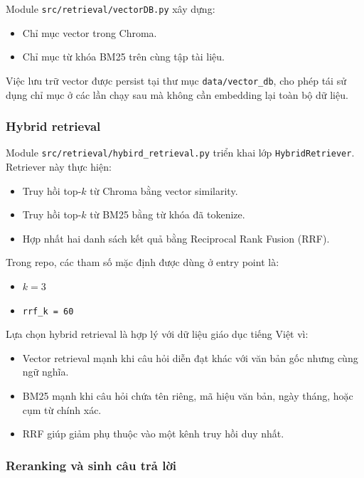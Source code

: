 \documentclass[12pt,a4paper]{article}
\begin{document}
Module \texttt{src/retrieval/vectorDB.py} xây dựng:
\begin{itemize}[leftmargin=1.5cm]
    \item Chỉ mục vector trong Chroma.
    \item Chỉ mục từ khóa BM25 trên cùng tập tài liệu.
\end{itemize}

Việc lưu trữ vector được persist tại thư mục \texttt{data/vector\_db}, cho phép tái sử dụng chỉ mục ở các lần chạy sau mà không cần embedding lại toàn bộ dữ liệu.

\subsubsection{Hybrid retrieval}

Module \texttt{src/retrieval/hybird\_retrieval.py} triển khai lớp \texttt{HybridRetriever}. Retriever này thực hiện:
\begin{itemize}[leftmargin=1.5cm]
    \item Truy hồi top-\(k\) từ Chroma bằng vector similarity.
    \item Truy hồi top-\(k\) từ BM25 bằng từ khóa đã tokenize.
    \item Hợp nhất hai danh sách kết quả bằng Reciprocal Rank Fusion (RRF).
\end{itemize}

Trong repo, các tham số mặc định được dùng ở entry point là:
\begin{itemize}[leftmargin=1.5cm]
    \item \(k = 3\)
    \item \texttt{rrf\_k = 60}
\end{itemize}

Lựa chọn hybrid retrieval là hợp lý với dữ liệu giáo dục tiếng Việt vì:
\begin{itemize}[leftmargin=1.5cm]
    \item Vector retrieval mạnh khi câu hỏi diễn đạt khác với văn bản gốc nhưng cùng ngữ nghĩa.
    \item BM25 mạnh khi câu hỏi chứa tên riêng, mã hiệu văn bản, ngày tháng, hoặc cụm từ chính xác.
    \item RRF giúp giảm phụ thuộc vào một kênh truy hồi duy nhất.
\end{itemize}

\subsubsection{Reranking và sinh câu trả lời}
\end{document}
